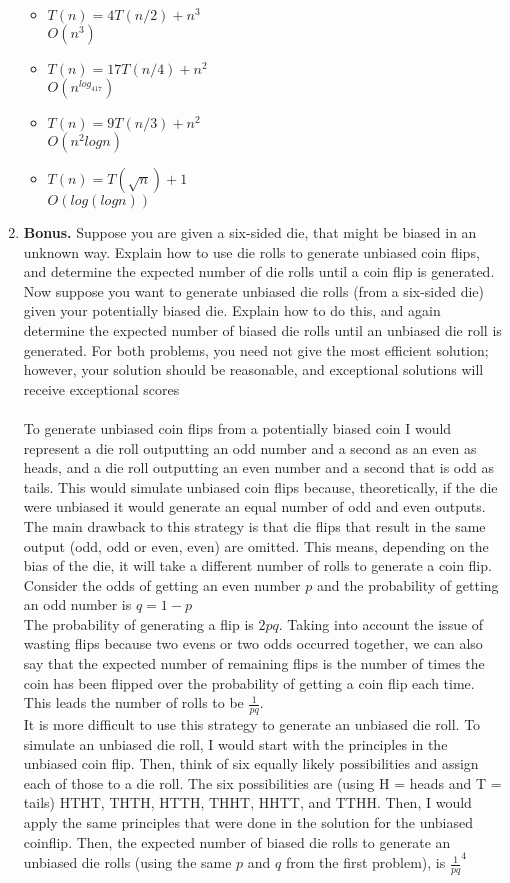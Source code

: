 \documentclass[11pt]{article}
\begin{document}
\begin{enumerate}
\begin{itemize}
\item $T(n) = 4T(n/2) + n^3$\\
$O(n^3)$
\item $T(n) = 17T(n/4)+n^2$\\
$O(n^{log_417})$
\item$T(n)=9T(n/3)+n^2$\\
$O(n^2logn)$
\item$T(n)=T(\sqrt{n})+1$\\
$O(log(logn))$
\end{itemize}

\item \textbf{Bonus.} Suppose you are given a six-sided die, that might be biased in an unknown way. Explain how to use die rolls to generate unbiased coin flips, and determine the expected number of die rolls until a coin flip is generated. Now suppose you want to generate unbiased die rolls (from a six-sided die) given your potentially biased die. Explain how to do this, and again determine the expected number of biased die rolls until an unbiased die roll is generated. For both problems, you need not give the most efficient solution; however, your solution should be reasonable, and exceptional solutions will
receive exceptional scores\\\\
To generate unbiased coin flips from a potentially biased coin I would represent a die roll outputting an odd number and a second as an even as heads, and a die roll outputting an even number and a second that is odd as tails. This would simulate unbiased coin flips because, theoretically, if the die were unbiased it would generate an equal number of odd and even outputs. \\
The main drawback to this strategy is that die flips that result in the same output (odd, odd or even, even) are omitted. This means, depending on the bias of the die, it will take a different number of rolls to generate a coin flip. \\
Consider the odds of getting an even number $p$ and the probability of getting an odd number is $q=1-p$\\
The probability of generating a flip is $2pq$. Taking into account the issue of wasting flips because two evens or two odds occurred together, we can also say that the expected number of remaining flips is the number of times the coin has been flipped over the probability of getting a coin flip each time. This leads the number of rolls to be $\frac{1}{pq}$.\\
It is more difficult to use this strategy to generate an unbiased die roll. To simulate an unbiased die roll, I would start with the principles in the unbiased coin flip. Then, think of six equally likely possibilities and assign each of those to a die roll. The six possibilities are (using H = heads and T = tails) HTHT, THTH, HTTH, THHT, HHTT, and TTHH. Then, I would apply the same principles that were done in the solution for the unbiased coinflip. Then, the expected number of biased die rolls to generate an unbiased die rolls (using the same $p$ and $q$ from the first problem), is ${\frac{1}{pq}}^4$
\end{enumerate}
\end{document}

